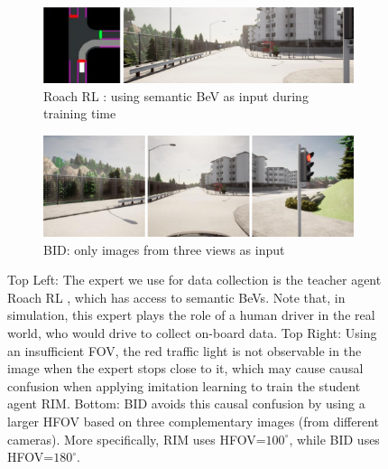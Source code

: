 \begin{figure}
	\centering
	\begin{subfigure}[b]{\linewidth}
		\centering
		\includegraphics[width=\textwidth]{fig/TLCausalConfusionA.png}
		\caption{Roach RL \cite{Zhang:2021}: using semantic BeV as input during training time}
		\label{fig:TLCausualConfusionB}
	\end{subfigure}
	\hfill
	\begin{subfigure}[b]{\linewidth}
		\centering
		\includegraphics[width=\textwidth]{fig/TLCausalConfusionB.png}
		\caption{BID: only images from three views as input}
		\label{fig:TLCausualConfusionA}
	\end{subfigure}
	\caption{Top Left: The expert we use for data collection is the teacher agent Roach RL \cite{Zhang:2021}, which has access to semantic BeVs. 
		Note that, in simulation, this expert plays the role of a human driver in the real world, who would drive to collect on-board data. 
		Top Right: Using an insufficient FOV, the red traffic light is not observable in the image when the expert stops close to it, which may cause causal confusion when applying imitation learning to train the student agent RIM. 
		Bottom: BID avoids this causal confusion by using a larger HFOV based on three complementary images (from different cameras). More specifically, RIM uses HFOV=$100^{\circ}$, while BID uses HFOV=$180^{\circ}$.}
	\label{fig:causalconfusion}
\end{figure}


